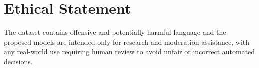 \section*{Ethical Statement}
\label{sec:ethical_statement}

The dataset contains offensive and potentially harmful language and the proposed models are intended only for research and moderation assistance, with any real-world use requiring human review to avoid unfair or incorrect automated decisions.

